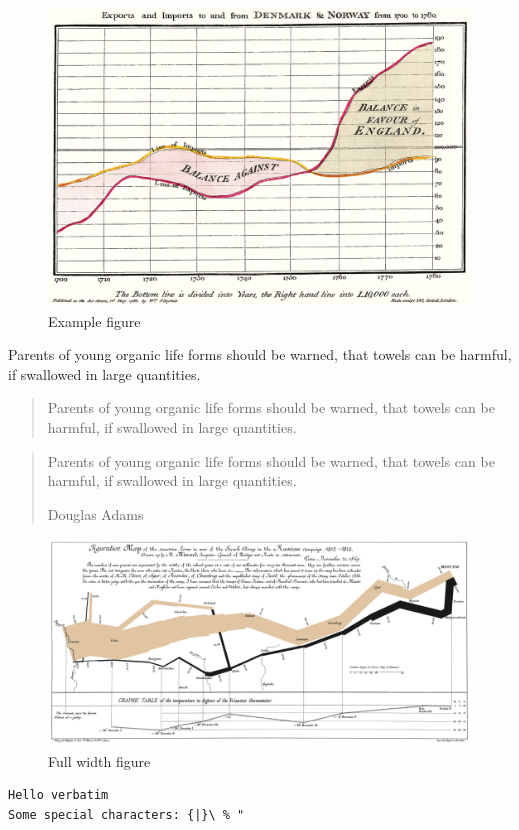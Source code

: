 \documentclass[]{tufte-book}
\begin{document}
\begin{figure}[tbt]
  \caption{Example figure}
  \includegraphics[width=\textwidth]{exports-imports.png}
\end{figure}

\kant[2]

\begin{displayquote}
Parents of young organic life forms should be warned, that
towels can be harmful, if swallowed in large quantities.
\end{displayquote}

\begin{quote}
Parents of young organic life forms should be warned, that
towels can be harmful, if swallowed in large quantities.
\end{quote}

\blockquote[Douglas Adams]{%
Parents of young organic life forms should be warned, that
towels can be harmful, if swallowed in large quantities.
}


\begin{figure}[tbt]
  \includegraphics[width=\textwidth]{napoleons-march.png}
  \caption{Full width figure}
\end{figure}
\begin{verbatim}
Hello verbatim 
Some special characters: {|}\ % "
\end{verbatim}
\end{document}
